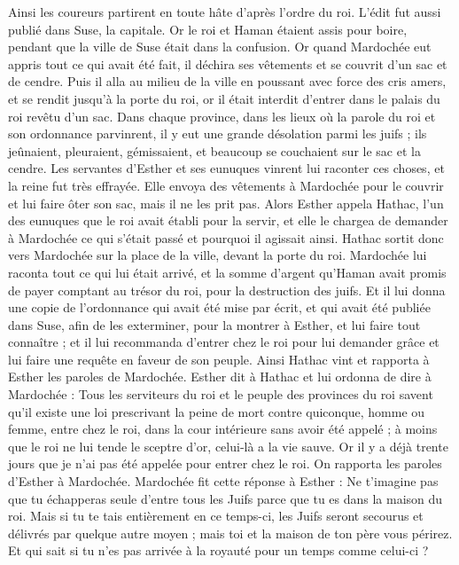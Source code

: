 \begin{multicols}{2}
Ainsi les coureurs partirent en toute hâte d’après l’ordre du roi. L'édit fut aussi publié dans Suse, la capitale. Or le roi et Haman étaient assis pour boire, pendant que la ville de Suse était dans la confusion.
\VerseOne{}Or quand Mardochée eut appris tout ce qui avait été fait, il déchira ses vêtements et se couvrit d'un sac et de cendre. Puis il alla au milieu de la ville en poussant avec force des cris amers,
et se rendit jusqu'à la porte du roi, or il était interdit d'entrer dans le palais du roi revêtu d'un sac.
Dans chaque province, dans les lieux où la parole du roi et son ordonnance parvinrent, il y eut une grande désolation parmi les juifs ; ils jeûnaient, pleuraient, gémissaient, et beaucoup se couchaient sur le sac et la cendre.
Les servantes d'Esther et ses eunuques vinrent lui raconter ces choses, et la reine fut très effrayée. Elle envoya des vêtements à Mardochée pour le couvrir et lui faire ôter son sac, mais il ne les prit pas.
Alors Esther appela Hathac, l'un des eunuques que le roi avait établi pour la servir, et elle le chargea de demander à Mardochée ce qui s’était passé et pourquoi il agissait ainsi.
Hathac sortit donc vers Mardochée sur la place de la ville, devant la porte du roi.
Mardochée lui raconta tout ce qui lui était arrivé, et la somme d'argent qu'Haman avait promis de payer comptant au trésor du roi, pour la destruction des juifs.
Et il lui donna une copie de l’ordonnance qui avait été mise par écrit, et qui avait été publiée dans Suse, afin de les exterminer, pour la montrer à Esther, et lui faire tout connaître ; et il lui recommanda d'entrer chez le roi pour lui demander grâce et lui faire une requête en faveur de son peuple.
Ainsi Hathac vint et rapporta à Esther les paroles de Mardochée.
Esther dit à Hathac et lui ordonna de dire à Mardochée :
Tous les serviteurs du roi et le peuple des provinces du roi savent qu'il existe une loi prescrivant la peine de mort contre quiconque, homme ou femme, entre chez le roi, dans la cour intérieure sans avoir été appelé ; à moins que le roi ne lui tende le sceptre d'or, celui-là a la vie sauve. Or il y a déjà trente jours que je n'ai pas été appelée pour entrer chez le roi.
On rapporta les paroles d'Esther à Mardochée.
Mardochée fit cette réponse à Esther : Ne t'imagine pas que tu échapperas seule d’entre tous les Juifs parce que tu es dans la maison du roi.
Mais si tu te tais entièrement en ce temps-ci, les Juifs seront secourus et délivrés par quelque autre moyen ; mais toi et la maison de ton père vous périrez. Et qui sait si tu n'es pas arrivée à la royauté pour un temps comme celui-ci ?

\end{multicols}
